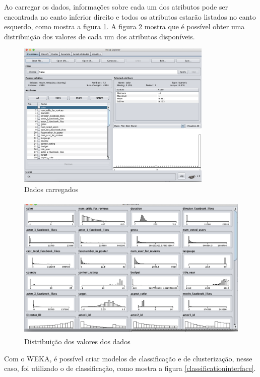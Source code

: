 Ao carregar os dados, informações sobre cada um dos atributos pode ser encontrada no canto inferior direito e todos os atributos estarão listados no canto esquerdo, como mostra a figura \ref{loadeddata}. A figura \ref{distribuicao} mostra que é possível obter uma distribuição dos valores de cada um dos atributos disponíveis.

\begin{figure}[H]
\centering
\includegraphics[height=7cm]{imagens/wekapreprocessingfull.png}
\caption{Dados carregados}
\label{loadeddata}
\end{figure}

\begin{figure}[H]
\centering
\includegraphics[height=7cm]{imagens/wekadistribuition.png}
\caption{Distribuição dos valores dos dados}
\label{distribuicao}
\end{figure}

Com o WEKA, é possível criar modelos de classificação e de clusterização, nesse caso, foi utilizado o de classificação, como mostra a figura \ref{classificationinterface}. 

